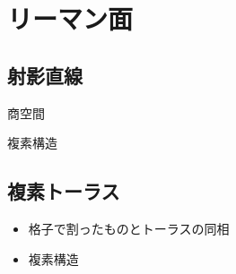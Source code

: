 \section{リーマン面}
\subsection{射影直線}
\item 商空間
\item 複素構造
\subsection{複素トーラス}
\begin{itemize}
\item 格子で割ったものとトーラスの同相
\item 複素構造    
\end{itemize}